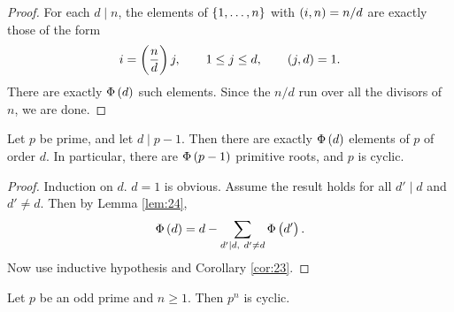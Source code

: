 \begin{proof}
For each $ d \mid n $, the elements of $ \cbr{1, \dots, n} $ with $ \br{i, n} = n / d $ are exactly those of the form
$$ i = \br{\dfrac{n}{d}}j, \qquad 1 \le j \le d, \qquad \br{j, d} = 1. $$
There are exactly $ \Phi\br{d} $ such elements. Since the $ n / d $ run over all the divisors of $ n $, we are done.
\end{proof}

\begin{theorem}
\label{thm:25}
Let $ p $ be prime, and let $ d \mid p - 1 $. Then there are exactly $ \Phi\br{d} $ elements of $ \unit{p} $ of order $ d $. In particular, there are $ \Phi\br{p - 1} $ primitive roots, and $ \unit{p} $ is cyclic.
\end{theorem}

\begin{proof}
Induction on $ d $. $ d = 1 $ is obvious. Assume the result holds for all $ d' \mid d $ and $ d' \ne d $. Then by Lemma \ref{lem:24},
$$ \Phi\br{d} = d - \sum_{d' \mid d, \ d' \ne d} \Phi\br{d'}. $$
Now use inductive hypothesis and Corollary \ref{cor:23}.
\end{proof}


\begin{proposition}
Let $ p $ be an odd prime and $ n \ge 1 $. Then $ \unit{p^n} $ is cyclic.
\end{proposition}

